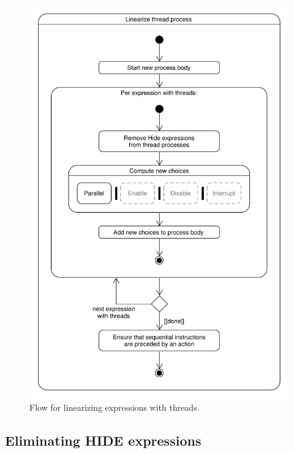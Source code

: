 \begin{figure}[!ht]
\begin{center}
\includegraphics[width=0.8\linewidth]{umlet/linearization-pbranch-flow}
\caption{Flow for linearizing expressions with threads.}
\label{pbranch-flow:fig}
\end{center}
\end{figure}

\clearpage
\subsection{Eliminating HIDE expressions}

